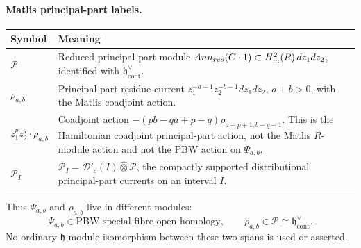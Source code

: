 \paragraph{Matlis principal-part labels.}
\begin{center}
\begin{tabular}{@{}>{\raggedright\arraybackslash}p{}
  >{\raggedright\arraybackslash}p{}@{}}
\hline
\textbf{Symbol} & \textbf{Meaning}\\
\hline
\(\mathcal P\) &
Reduced principal-part module
\(Ann_{res}(C\cdot1)\subset
H^2_{m}(R)\,dz_1dz_2\), identified with
\(\mathfrak h^\vee_{\mathrm{cont}}\).\\
\hline
\(\rho_{a,b}\) &
Principal-part residue current
\(z_1^{-a-1}z_2^{-b-1}dz_1dz_2\), \(a+b>0\), with the Matlis
coadjoint action.\\
\hline
\(z_1^p z_2^q\cdot\rho_{a,b}\) &
Coadjoint action
\(-(pb-qa+p-q)\rho_{a-p+1,b-q+1}\). This is the Hamiltonian coadjoint
principal-part action, not the Matlis \(R\)-module action and not the
PBW action on \(\Psi_{a,b}\).\\
\hline
\(\mathcal P_I\) &
\(\mathcal P_I=\mathcal D'_c(I)\widehat\otimes\mathcal P\), the
compactly supported distributional principal-part currents on an interval
\(I\).\\
\hline
\end{tabular}
\end{center}

Thus \(\Psi_{a,b}\) and \(\rho_{a,b}\) live in different modules:
\[
  \Psi_{a,b}\in\text{PBW special-fibre open homology},\qquad
  \rho_{a,b}\in
  \mathcal P\cong\mathfrak h^\vee_{\mathrm{cont}}.
\]
No ordinary \(\mathfrak h\)-module isomorphism between these two spans
is used or asserted.

